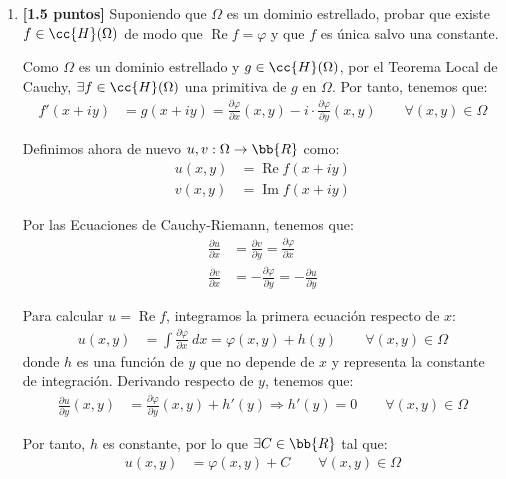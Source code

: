 \documentclass[12pt]{article}
\renewcommand{\Re}{\operatorname{Re}} %
\renewcommand{\Im}{\operatorname{Im}}
\begin{document}
\begin{ejercicio}
\begin{enumerate}
            \item \textbf{[1.5 puntos]} Suponiendo que $\Omega$ es un dominio estrellado, probar que existe $f \in \cc{H}(\Omega)$ de modo que $\Re f = \varphi$ y que $f$ es única salvo una constante.
            
            Como $\Omega$ es un dominio estrellado y $g\in \cc{H}(\Omega)$, por el Teorema Local de Cauchy, $\exists f\in \cc{H}(\Omega)$ una primitiva de $g$ en $\Omega$. Por tanto, tenemos que:
        \begin{align*}
            f'(x+iy) &= g(x + iy) = \frac{\partial \varphi}{\partial x}(x, y) - i\cdot  \frac{\partial \varphi}{\partial y}(x, y)\qquad \forall (x, y) \in \Omega
        \end{align*}

        Definimos ahora de nuevo $u,v:\Omega\to \bb{R}$ como:
        \begin{align*}
            u(x,y) &= \Re f(x+iy)\\
            v(x,y) &= \Im f(x+iy)
        \end{align*}

        Por las Ecuaciones de Cauchy-Riemann, tenemos que:
        \begin{align*}
            \frac{\partial u}{\partial x} &= \frac{\partial v}{\partial y}= \frac{\partial \varphi}{\partial x}\\
            \frac{\partial v}{\partial x} &= -\frac{\partial \varphi}{\partial y}=-\frac{\partial u}{\partial y}
        \end{align*}

        Para calcular $u=\Re f$, integramos la primera ecuación respecto de $x$:
        \begin{align*}
            u(x,y) &= \int \frac{\partial \varphi}{\partial x}\ dx = \varphi(x,y) + h(y)\qquad \forall (x,y) \in \Omega
        \end{align*}
        donde $h$ es una función de $y$ que no depende de $x$ y representa la constante de integración. Derivando respecto de $y$, tenemos que:
        \begin{align*}
            \frac{\partial u}{\partial y}(x,y) &= \frac{\partial \varphi}{\partial y}(x,y) + h'(y)\Longrightarrow
            h'(y) = 0\qquad \forall (x,y) \in \Omega
        \end{align*}

        Por tanto, $h$ es constante, por lo que $\exists C\in \bb{R}$ tal que:
        \begin{align*}
            u(x,y) &= \varphi(x,y) + C\qquad \forall (x,y) \in \Omega
        \end{align*}  
        

\end{enumerate}
\end{ejercicio}
\end{document}
